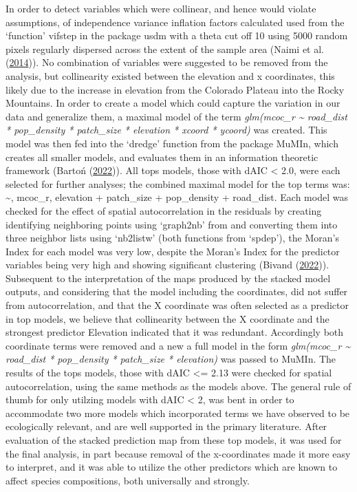 \documentclass[
]{article}
\begin{document}
In order to detect variables which were collinear, and hence would
violate assumptions, of independence variance inflation factors
calculated used from the `function' vifstep in the package usdm with a
theta cut off 10 using 5000 random pixels regularly dispersed across the
extent of the sample area (Naimi et al.
(\protect\hyperlink{ref-naimi2014usdm}{2014})). No combination of
variables were suggested to be removed from the analysis, but
collinearity existed between the elevation and x coordinates, this
likely due to the increase in elevation from the Colorado Plateau into
the Rocky Mountains. In order to create a model which could capture the
variation in our data and generalize them, a maximal model of the term
\emph{glm(mcoc\_r \textasciitilde{} road\_dist * pop\_density *
patch\_size * elevation * xcoord * ycoord)} was created. This model was
then fed into the `dredge' function from the package MuMIn, which
creates all smaller models, and evaluates them in an information
theoretic framework (Bartoń
(\protect\hyperlink{ref-Barton2022mumin}{2022})). All tops models, those
with dAIC \textless{} 2.0, were each selected for further analyses; the
combined maximal model for the top terms was: \textasciitilde, mcoc\_r,
elevation + patch\_size + pop\_density + road\_dist. Each model was
checked for the effect of spatial autocorrelation in the residuals by
creating identifying neighboring points using `graph2nb' from and
converting them into three neighbor lists using `nb2listw' (both
functions from `spdep'), the Moran's Index for each model was very low,
despite the Moran's Index for the predictor variables being very high
and showing significant clustering (Bivand
(\protect\hyperlink{ref-bivand2022spdep}{2022})). Subsequent to the
interpretation of the maps produced by the stacked model outputs, and
considering that the model including the coordinates, did not suffer
from autocorrelation, and that the X coordinate was often selected as a
predictor in top models, we believe that collinearity between the X
coordinate and the strongest predictor Elevation indicated that it was
redundant. Accordingly both coordinate terms were removed and a new a
full model in the form \emph{glm(mcoc\_r \textasciitilde{} road\_dist *
pop\_density * patch\_size * elevation)} was passed to MuMIn. The
results of the tops models, those with dAIC \textless= 2.13 were checked
for spatial autocorrelation, using the same methods as the models above.
The general rule of thumb for only utilzing models with dAIC \textless{}
2, was bent in order to accommodate two more models which incorporated
terms we have observed to be ecologically relevant, and are well
supported in the primary literature. After evaluation of the stacked
prediction map from these top models, it was used for the final
analysis, in part because removal of the x-coordinates made it more easy
to interpret, and it was able to utilize the other predictors which are
known to affect species compositions, both universally and strongly.
\end{document}
